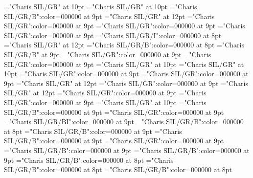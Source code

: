 \documentclass[gps1,twoside]{article}
\begin{document}
\pagestyle{plain}
\sloppy
\setlength{\parfillskip}{0pt plus 1fil}
\font\xitemte="Charis SIL/GR" at 10pt
\font\xitemhi="Charis SIL/GR" at 10pt
\font\xitemxitemcomplexformformbefore="Charis SIL/GR/B":color=000000 at 9pt
\font\xitemxitemcomplexformrefsbefore="Charis SIL/GR" at 12pt
\font\xitemxitemdefinitionbefore="Charis SIL/GR":color=000000 at 9pt
\font\xitemxitementryrefcomponentbefore="Charis SIL/GR":color=000000 at 9pt
\font\xitemxitementryreftypebefore="Charis SIL/GR":color=000000 at 9pt
\font\xitemxitemexamplebefore="Charis SIL/GR/I":color=000000 at 8pt
\font\xitemxitemexamplesbefore="Charis SIL/GR" at 12pt
\font\xitemxitemheadwordbefore="Charis SIL/GR/B":color=000000 at 8pt
\font\xitemxitemLexEntrypublishStemComponentTargetHeadWordRefbefore="Charis SIL/GR/B" at 9pt
\font\xitemxitemLexEntryTypepublishStemComplexFormTypeReverseAbbrPubbefore="Charis SIL/GR":color=000000 at 9pt
\font\xitemxitemLexEntryTypepublishStemEntryTypeAbbreviationPubbefore="Charis SIL/GR":color=000000 at 9pt
\font\xitemxitemLexSensepublishStemGlossPubLdbefore="Charis SIL/GR" at 10pt
\font\xitemxitemLexSensepublishStemGlossPubLebefore="Charis SIL/GR" at 10pt
\font\xitemxitempartofspeechbefore="Charis SIL/GR":color=000000 at 9pt
\font\xitemxitempictureLabelbefore="Charis SIL/GR":color=000000 at 9pt
\font\xitemxitemprimaryrefsbefore="Charis SIL/GR" at 12pt
\font\xitemxitempronunciationbefore="Charis SIL/GR":color=000000 at 9pt
\font\xitemxitempronunciationsbefore="Charis SIL/GR" at 12pt
\font\sensesensesensesbefore="Charis SIL/GR":color=000000 at 9pt
\font\xitemxitemtranslationbefore="Charis SIL/GR":color=000000 at 9pt
\font\xitemxitemtranslationLdbefore="Charis SIL/GR" at 10pt
\font\xitemxitemcrossrefbefore="Charis SIL/GR/B":color=000000 at 9pt
\font\xitemxitemcrossreftargetsbefore="Charis SIL/GR":color=000000 at 9pt
\font\xitemxitemcrossreftypebefore="Charis SIL/GR/BI":color=000000 at 9pt
\font\xitemxitemheadwordminorbefore="Charis SIL/GR/B":color=000000 at 8pt
\font\xitemxitemmainentryrefbefore="Charis SIL/GR/B":color=000000 at 9pt
\font\xitemxitemmainentryrefminorbefore="Charis SIL/GR/B":color=000000 at 9pt
\font\xitemxitempronunciationminorbefore="Charis SIL/GR":color=000000 at 9pt
\font\xitemxitemsensecrossrefbefore="Charis SIL/GR/B":color=000000 at 9pt
\font\xitemxitemsensemainentryrefbefore="Charis SIL/GR/B":color=000000 at 9pt
\font\xitemxitemheadwordsubbefore="Charis SIL/GR/B":color=000000 at 8pt
\font\xitemxitemLexEntrypublishRootMinorPrimaryTargetMLHeadWordPubbefore="Charis SIL/GR/B":color=000000 at 8pt
\font\xitemxitemLexEntrypublishStemMinorPrimaryTargetMLHeadWordPubbefore="Charis SIL/GR/B":color=000000 at 8pt
\end{document}
